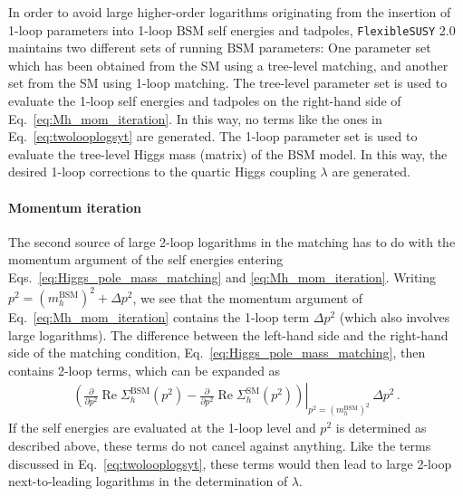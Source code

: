 \documentclass[final,3p,11pt,pdflatex]{elsarticle}
\makeatletter
\newcommand{\fs}{\texttt{FlexibleSUSY}\@\xspace}
\newcommand{\fstwo}{\fs 2.0\@\xspace}
\newcommand{\SM}{\ensuremath{\text{SM}}\xspace}
\newcommand{\BSM}{\ensuremath{\text{BSM}}\xspace}
\DeclareMathOperator{\re}{Re}
\makeatother
\begin{document}
In order to avoid large higher-order logarithms originating from the
insertion of 1-loop parameters into 1-loop \BSM self energies and
tadpoles, \fstwo maintains two different sets of running \BSM
parameters: One parameter set which has been obtained from the
SM using a tree-level matching, and another set
from the SM using  1-loop matching.
%
The tree-level parameter set is used to evaluate the 1-loop self
energies and tadpoles on the right-hand side of
Eq.~\eqref{eq:Mh_mom_iteration}.  In this way, no terms like the ones
in Eq.~\eqref{eq:twolooplogsyt} are generated.
%
The 1-loop parameter set is used to evaluate the tree-level Higgs
mass (matrix) of the \BSM model.  In this way, the desired 1-loop
corrections to the quartic Higgs coupling $\lambda$ are generated.

\paragraph{Momentum iteration}

The second source of large 2-loop logarithms in the matching has to
do with the momentum argument of the self energies entering
Eqs.~\eqref{eq:Higgs_pole_mass_matching} and \eqref{eq:Mh_mom_iteration}.
Writing $p^2=(m_h^\BSM)^2+\Delta p^2$, we see
that the momentum argument of Eq.~\eqref{eq:Mh_mom_iteration}
contains the 1-loop term $\Delta p^2$ (which
also involves large logarithms).
%
The difference between the left-hand side and the right-hand side of the
matching condition, Eq.~\eqref{eq:Higgs_pole_mass_matching},
then contains 2-loop terms, which can be expanded as
%
\begin{align}
\left.\left(
\frac{\partial}{\partial
        p^2}\re\Sigma_h^{\BSM}(p^2)
-
\frac{\partial}{\partial
        p^2}\re\Sigma_h^{\SM}(p^2)
\right)
\right|_{p^2 = (m_h^\BSM)^2}
\,\Delta p^2
\,.
\end{align}
%
If the self energies
are evaluated at the 1-loop level and $p^2$ is determined as
described above, these terms do not cancel against anything.
Like the terms discussed in Eq.~\eqref{eq:twolooplogsyt}, these terms
would then lead to large 2-loop next-to-leading logarithms in the
determination of $\lambda$.%
\end{document}
